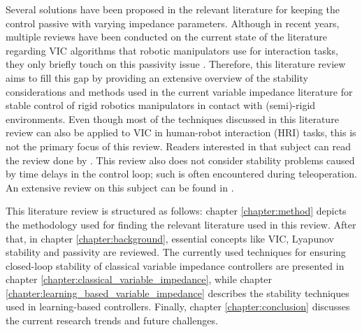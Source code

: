 Several solutions have been proposed in the relevant literature for keeping the control passive with varying impedance parameters. Although in recent years, multiple reviews have been conducted on the current state of the literature regarding VIC algorithms that robotic manipulators use for interaction tasks, they only briefly touch on this passivity issue \cite{suomalainenSurveyRobotManipulation2021,songTutorialSurveyComparison2019,abu-dakkaVariableImpedanceControl2020,al-shukaActiveImpedanceControl2018}. Therefore, this literature review aims to fill this gap by providing an extensive overview of the stability considerations and methods used in the current variable impedance literature for stable control of rigid robotics manipulators in contact with (semi)-rigid environments. Even though most of the techniques discussed in this literature review can also be applied to VIC in human-robot interaction (HRI) tasks, this is not the primary focus of this review. Readers interested in that subject can read the review done by \cite{sharifiImpedanceVariationLearning2021}. This review also does not consider stability problems caused by time delays in the control loop; such is often encountered during teleoperation. An extensive review on this subject can be found in \cite{farajiparvarBriefSurveyTelerobotic2020}.

This literature review is structured as follows: chapter \ref{chapter:method} depicts the methodology used for finding the relevant literature used in this review. After that, in chapter \ref{chapter:background}, essential concepts like VIC, Lyapunov stability and passivity are reviewed. The currently used techniques for ensuring closed-loop stability of classical variable impedance controllers are presented in chapter \ref{chapter:classical_variable_impedance}, while chapter \ref{chapter:learning_based_variable_impedance} describes the stability techniques used in learning-based controllers. Finally, chapter \ref{chapter:conclusion} discusses the current research trends and future challenges.
